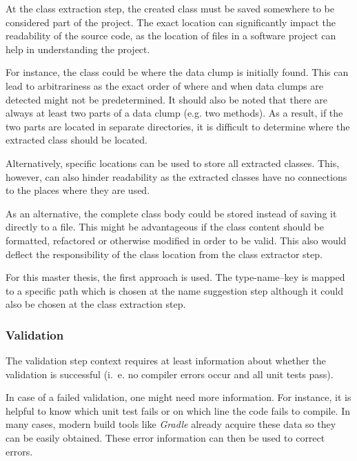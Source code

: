 At the class extraction step, the created class must be saved somewhere to be considered part of the project. The exact location can significantly impact the readability of the source code, as the location of files in a software project can help in understanding the project. 

For instance, the class could be where the data clump is initially found. This can lead to arbitrariness as the exact order of where and when data clumps are detected might not be predetermined. It should also be noted that there are always at least two parts of a data clump (e.g. two methods). As a result, if the two parts are located in separate directories, it is difficult to determine where the extracted class should be located. 

Alternatively, specific locations can be used to store all extracted classes. This, however, can also hinder readability as the extracted classes have no connections to the places where they are used. 

As an alternative, the complete class body could be stored instead of saving it directly to a file. This might be advantageous if the class content should be formatted, refactored or otherwise modified in order to be valid. This also would deflect the responsibility of the class location from the class extractor step. 

For this master thesis, the first approach is used. The type-name--key is mapped to a specific path which is chosen at the name suggestion step although it could also be chosen at the class extraction step. 

 
\subsubsection{Validation}

The validation step context requires at least information about whether the validation is successful (i.~e. no compiler errors occur and all unit tests pass). 

In case of a failed validation, one might need more information. For instance, it is helpful to know which unit test fails or on which line the code fails to compile. In many cases, modern build tools like \textit{Gradle} already acquire these data so they can be easily obtained. These error information can then be used to correct errors. 




